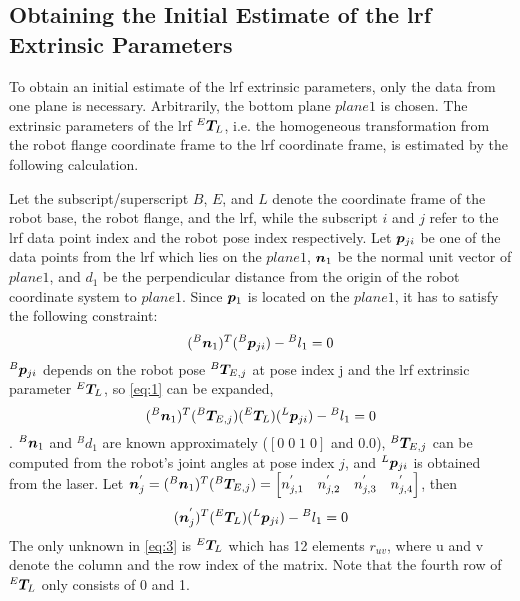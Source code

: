 \subsection{Obtaining the Initial Estimate of the \ac{lrf} Extrinsic Parameters}
\label{sec:first_step}
To obtain an initial estimate of the \ac{lrf} extrinsic parameters, only the data from one plane is necessary. Arbitrarily, the bottom plane $plane 1$ is chosen. The extrinsic parameters of the \ac{lrf} ${^E}\vb*{T}_L$, i.e. the homogeneous transformation from the robot flange coordinate frame to the \ac{lrf} coordinate frame, is estimated by the following calculation. 

Let the subscript/superscript $B$, $E$, and $L$ denote the coordinate frame of the robot base, the robot flange, and the \ac{lrf}, while the subscript $i$ and $j$ refer to the \ac{lrf} data point index and the robot pose index respectively. Let $\vb*{p}_{ji}$ be one of the data points from the \ac{lrf} which lies on the $plane 1$, $\vb*{n}_1$ be the normal unit vector of $plane 1$, and $d_1$ be the perpendicular distance from the origin of the robot coordinate system to $plane 1$.  Since $\vb*{p}_1$ is located on the $plane 1$, it has to satisfy the following constraint:
  \begin{equation}
  \label{eq:1}
  ({^B}\vb*{n}_1) ^T ({^B}\vb*{p}_{ji}) - {^B}l_1 = 0
   \end{equation}
${^B}\vb*{p}_{ji}$ depends on the robot pose ${^B}\vb*{T}_{E,j}$ at pose index j and the \ac{lrf} extrinsic parameter ${^E}\vb*{T}_L$, so \eqref{eq:1}  can be expanded,
  \begin{equation}
  ({^B}\vb*{n}_1) ^T ({^B}\vb*{T}_{E,j}) ({^E}\vb*{T}_L) ({^L}\vb*{p}_{ji}) - {^B}l_1 = 0
  \end{equation}.
${^B}\vb*{n}_1$ and $^{B}d_1$ are known approximately ($[0 \; 0\; 1\;0]$ and $0.0$), ${^B}\vb*{T}_{E,j}$ can be computed from the robot's joint angles at pose index $j$, and ${^L}\vb*{p}_{ji}$ is obtained from the laser. Let $\vb*{n}^{'}_j = ({^B}\vb*{n}_1) ^T ({^B}\vb*{T}_{E,j}) = 
\left[n^{'}_{j,1} \quad n^{'}_{j,2} \quad n^{'}_{j,3}  \quad n^{'}_{j,4} \right]$, then  
  \begin{equation}
  \label{eq:3}
  (\vb*{n}^{'}_j) ^T ({^E}\vb*{T}_L) ({^L}\vb*{p}_{ji}) - {^B}l_1 = 0
  \end{equation}
The only unknown in \eqref{eq:3} is ${^E}\vb*{T}_L$ which has 12 elements $r_{uv}$, where u and v denote the column and the row index of the matrix. Note that the fourth row of ${^E}\vb*{T}_L$ only consists of 0 and 1. 
